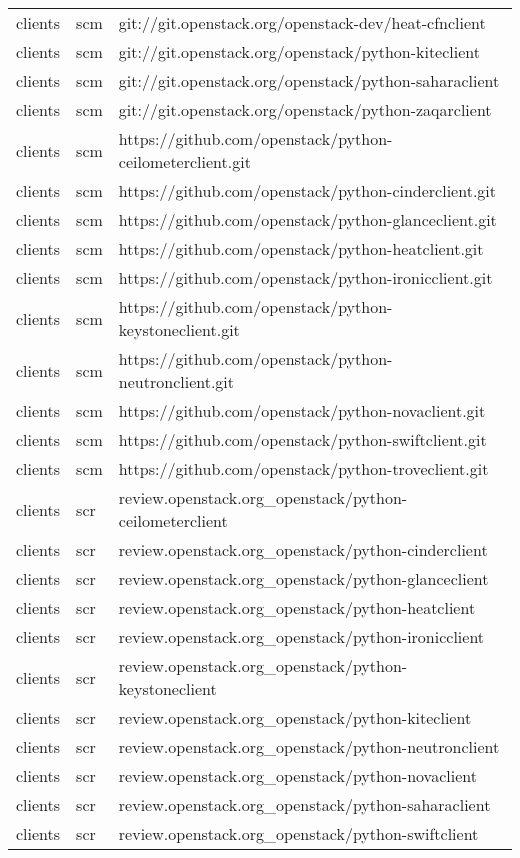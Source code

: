 \begin{center}
\begin{longtable}{|p{4cm}|p{1cm}|p{10cm}|}
clients&scm&git://git.openstack.org/openstack-dev/heat-cfnclient\\ 
clients&scm&git://git.openstack.org/openstack/python-kiteclient\\ 
clients&scm&git://git.openstack.org/openstack/python-saharaclient\\ 
clients&scm&git://git.openstack.org/openstack/python-zaqarclient\\ 
clients&scm&https://github.com/openstack/python-ceilometerclient.git\\ 
clients&scm&https://github.com/openstack/python-cinderclient.git\\ 
clients&scm&https://github.com/openstack/python-glanceclient.git\\ 
clients&scm&https://github.com/openstack/python-heatclient.git\\ 
clients&scm&https://github.com/openstack/python-ironicclient.git\\ 
clients&scm&https://github.com/openstack/python-keystoneclient.git\\ 
clients&scm&https://github.com/openstack/python-neutronclient.git\\ 
clients&scm&https://github.com/openstack/python-novaclient.git\\ 
clients&scm&https://github.com/openstack/python-swiftclient.git\\ 
clients&scm&https://github.com/openstack/python-troveclient.git\\ 
clients&scr&review.openstack.org\_openstack/python-ceilometerclient\\ 
clients&scr&review.openstack.org\_openstack/python-cinderclient\\ 
clients&scr&review.openstack.org\_openstack/python-glanceclient\\ 
clients&scr&review.openstack.org\_openstack/python-heatclient\\ 
clients&scr&review.openstack.org\_openstack/python-ironicclient\\ 
clients&scr&review.openstack.org\_openstack/python-keystoneclient\\ 
clients&scr&review.openstack.org\_openstack/python-kiteclient\\ 
clients&scr&review.openstack.org\_openstack/python-neutronclient\\ 
clients&scr&review.openstack.org\_openstack/python-novaclient\\ 
clients&scr&review.openstack.org\_openstack/python-saharaclient\\ 
clients&scr&review.openstack.org\_openstack/python-swiftclient\\ 

\end{longtable}
\end{center}
